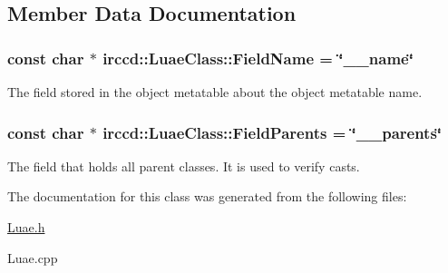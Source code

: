 \subsection{Member Data Documentation}
\hypertarget{a00041_a3e37a95a21a5679bfa8b6aef60e90a37}{
\subsubsection[{Field\-Name}]{\setlength{\rightskip}{0pt plus 5cm}const char $\ast$ irccd\-::\-Luae\-Class\-::\-Field\-Name = \char`\"{}\-\_\-\-\_\-name\char`\"{}\hspace{0.3cm}{\ttfamily [static]}}}\label{a00041_a3e37a95a21a5679bfa8b6aef60e90a37}
The field stored in the object metatable about the object metatable name. \hypertarget{a00041_a7a3e4d84ade883c52375f88ad3ad8e04}{
\subsubsection[{Field\-Parents}]{\setlength{\rightskip}{0pt plus 5cm}const char $\ast$ irccd\-::\-Luae\-Class\-::\-Field\-Parents = \char`\"{}\-\_\-\-\_\-parents\char`\"{}\hspace{0.3cm}{\ttfamily [static]}}}\label{a00041_a7a3e4d84ade883c52375f88ad3ad8e04}
The field that holds all parent classes. It is used to verify casts. 

The documentation for this class was generated from the following files\-:\begin{DoxyCompactItemize}
\item 
\hyperlink{a00089}{Luae.\-h}\item 
Luae.\-cpp\end{DoxyCompactItemize}
